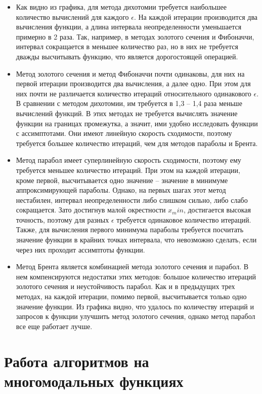 \documentclass[12pt]{article}
\begin{document}
\begin{itemize}
\item Как видно из графика, для метода дихотомии требуется наибольшее количество вычислений для каждого $\epsilon$. На каждой итерации производится два вычисления функции, а длина интервала неопределенности уменьшается примерно в 2 раза. Так, например, в методах золотого сечения и Фибоначчи, интервал сокращается в меньшее количество раз, но в них не требуется дважды высчитывать функцию, что является дорогостоящей операцией.

\item Метод золотого сечения и метод Фибоначчи почти одинаковы, для них на первой итерации производится два вычисления, а далее одно. При этом для них почти не различается количество итераций относительного одинакового $\epsilon$. В сравнении с методом дихотомии, им требуется в 1,3 -- 1,4 раза меньше вычислений функций. В этих методах не требуется вычислять значение функции на границах промежутка, а значит, ими удобно исследовать функции с ассимптотами. Они имеют линейную скорость сходимости, поэтому требуется большее количество итераций, чем для методов параболы и Брента.

\item Метод парабол имеет суперлинейную скорость сходимости, поэтому ему требуется меньшее количество итераций. При этом на каждой итерации, кроме первой, высчитывается одно значение -- значение в минимуме аппроксимирующей параболы. Однако, на первых шагах этот метод нестабилен, интервал неопределенности либо слишком сильно, либо слабо сокращается. Зато достигнув малой окрестности $x_min$, достигается высокая точность, поэтому для разных $\epsilon$ требуется одинаковое количество итераций. Также, для вычисления первого минимума параболы требуется посчитать значение функции в крайних точках интервала, что невозможно сделать, если через них проходит ассимптоты функции.

\item Метод Брента является комбинацией метода золотого сечения и парабол. В нем компенсируются недостатки этих методов: большое количество итераций золотого сечения и неустойчивость парабол. Как и в предыдущих трех методах, на каждой итерации, помимо первой, высчитывается только одно значение функции. Из графика видно, что удалось по количеству итераций и запросов к функции улучшить метод золотого сечения, однако метод парабол все еще работает лучше. 
\end{itemize}

\newpage
\section{Работа алгоритмов на многомодальных функциях}
\end{document}

